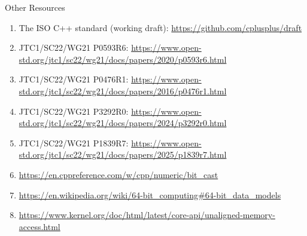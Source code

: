 
\begin{frame}{Other Resources}
  \begin{enumerate}
    \footnotesize
  \item The ISO C++ standard (working draft): \url{https://github.com/cplusplus/draft}

  \item JTC1/SC22/WG21 P0593R6: \url{https://www.open-std.org/jtc1/sc22/wg21/docs/papers/2020/p0593r6.html}
  \item JTC1/SC22/WG21 P0476R1: \url{https://www.open-std.org/jtc1/sc22/wg21/docs/papers/2016/p0476r1.html}
  \item JTC1/SC22/WG21 P3292R0: \url{https://www.open-std.org/jtc1/sc22/wg21/docs/papers/2024/p3292r0.html}
  \item JTC1/SC22/WG21 P1839R7: \url{https://www.open-std.org/jtc1/sc22/wg21/docs/papers/2025/p1839r7.html}
    \medskip

  \item \url{https://en.cppreference.com/w/cpp/numeric/bit_cast}
    \medskip

  \item \url{https://en.wikipedia.org/wiki/64-bit_computing\#64-bit_data_models}
    \medskip

  \item \url{https://www.kernel.org/doc/html/latest/core-api/unaligned-memory-access.html}
  \end{enumerate}
\end{frame}
